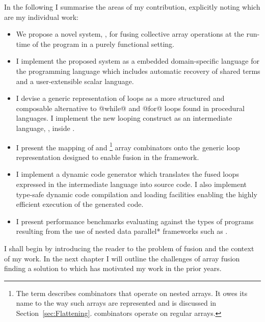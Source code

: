 \documentclass[preamble.tex]{subfiles}
\begin{document}
In the following I summarise the areas of my contribution, explicitly noting which are my individual work:
\begin{itemize}

  \item We propose a novel system, \LiveFusion, for fusing collective array operations at the run-time of the program in a purely functional setting.

  \item I implement the proposed system as a embedded domain-specific language for the \Haskell programming language which includes automatic recovery of shared terms and a user-extensible scalar language.

  \item I devise a generic representation of loops as a more structured and composable alternative to @while@ and @for@ loops found in procedural languages. I implement the new looping construct as an intermediate language, \Loop, inside \LiveFusion.

  \item I present the mapping of  and \footnote{The term  describes combinators that operate on nested arrays. It owes its name to the way such arrays are represented and is discussed in Section~\ref{sec:Flattening}.  combinators operate on regular arrays.} array combinators onto the generic loop representation designed to enable fusion in the  framework.

  \item I implement a dynamic code generator which translates the fused loops expressed in the intermediate \Loop language into \Haskell source code. I also implement type-safe dynamic code compilation and loading facilities enabling the highly efficient execution of the generated code.

  \item I present performance benchmarks evaluating \LiveFusion against the types of programs resulting from the use of \*nested data parallel* frameworks such as .

\end{itemize}

I shall begin by introducing the reader to the problem of fusion and the context of my work. In the next chapter I will outline the challenges of array fusion finding a solution to which has motivated my work in the prior years.




\IfNotCompilingAll{}
\end{document}
